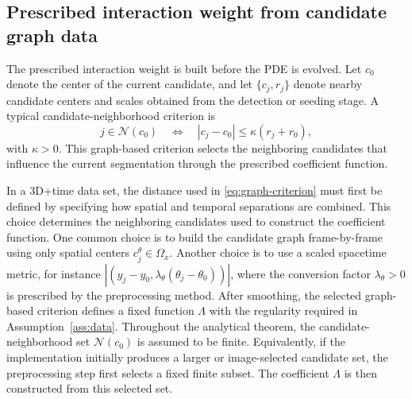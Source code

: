 \documentclass[11pt]{article}
\theoremstyle{remark}
\newcommand{\cN}{\mathcal{N}}
\begin{document}
\subsection{Prescribed interaction weight from candidate graph data}
\label{subsec:interaction-weight}

The prescribed interaction weight is built before the PDE is evolved. Let $c_0$ denote the center of the current candidate, and let $\{c_j,r_j\}$ denote nearby candidate centers and scales obtained from the detection or seeding stage. A typical candidate-neighborhood criterion is
\begin{equation}\label{eq:graph-criterion}
j\in\cN(c_0) \quad\Longleftrightarrow\quad
|c_j-c_0|\le \kappa(r_j+r_0),
\end{equation}
with $\kappa>0$. This graph-based criterion selects the neighboring candidates that influence the current segmentation through the prescribed coefficient function.

In a 3D+time data set, the distance used in \eqref{eq:graph-criterion} must first be defined by specifying how spatial and temporal separations are combined. This choice determines the neighboring candidates used to construct the coefficient function. One common choice is to build the candidate graph frame-by-frame using only spatial centers $c_j^\theta\in\Omega_x$. Another choice is to use a scaled spacetime metric, for instance $|(y_j-y_0,\lambda_\theta(\theta_j-\theta_0))|$, where the conversion factor $\lambda_\theta>0$ is prescribed by the preprocessing method. After smoothing, the selected graph-based criterion defines a fixed function $\Lambda$ with the regularity required in Assumption~\ref{ass:data}. Throughout the analytical theorem, the candidate-neighborhood set $\cN(c_0)$ is assumed to be finite. Equivalently, if the implementation initially produces a larger or image-selected candidate set, the preprocessing step first selects a fixed finite subset. The coefficient $\Lambda$ is then constructed from this selected set.
\end{document}
